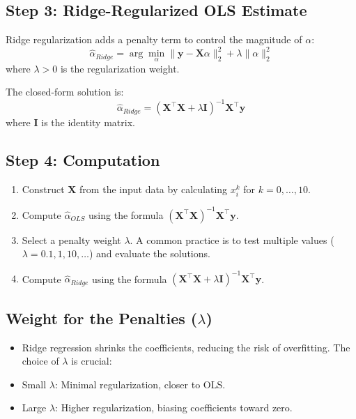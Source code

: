 \subsection*{Step 3: Ridge-Regularized OLS Estimate}
Ridge regularization adds a penalty term to control the magnitude of $\alpha$:
\begin{equation}
\hat{\alpha}_{Ridge} = \arg \min_\alpha \|\mathbf{y} - \mathbf{X} \alpha\|_2^2 + \lambda \|\alpha\|_2^2
\end{equation}
where $\lambda > 0$ is the regularization weight.

The closed-form solution is:
\begin{equation}
\hat{\alpha}_{Ridge} = (\mathbf{X}^\top \mathbf{X} + \lambda \mathbf{I})^{-1} \mathbf{X}^\top \mathbf{y}
\end{equation}
where $\mathbf{I}$ is the identity matrix.

\subsection*{Step 4: Computation}
\begin{enumerate}
    \item Construct $\mathbf{X}$ from the input data by calculating $x_i^k$ for $k = 0, \dots, 10$.
    \item Compute $\hat{\alpha}_{OLS}$ using the formula $(\mathbf{X}^\top \mathbf{X})^{-1} \mathbf{X}^\top \mathbf{y}$.
    \item Select a penalty weight $\lambda$. A common practice is to test multiple values ($ \lambda = 0.1, 1, 10, \dots $) and evaluate the solutions.
    \item Compute $\hat{\alpha}_{Ridge}$ using the formula $(\mathbf{X}^\top \mathbf{X} + \lambda \mathbf{I})^{-1} \mathbf{X}^\top \mathbf{y}$.
\end{enumerate}

\subsection*{Weight for the Penalties ($\lambda$)}
\begin{itemize}
    \item Ridge regression shrinks the coefficients, reducing the risk of overfitting. The choice of $\lambda$ is crucial: 
    \item Small $\lambda$: Minimal regularization, closer to OLS.
    \item Large $\lambda$: Higher regularization, biasing coefficients toward zero.
\end{itemize}

